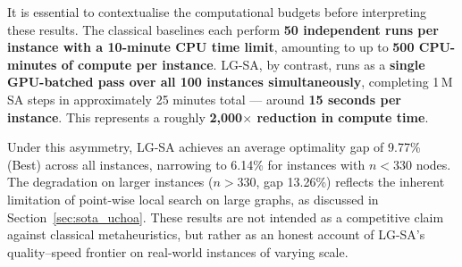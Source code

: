 \documentclass[letterpaper]{article} %
\begin{document}
It is essential to contextualise the computational budgets before interpreting these results.
The classical baselines each perform \textbf{50 independent runs per instance with a 10-minute CPU time limit}, amounting to up to \textbf{500 CPU-minutes of compute per instance}.
LG-SA, by contrast, runs as a \textbf{single GPU-batched pass over all 100 instances simultaneously}, completing 1\,M SA steps in approximately 25 minutes total — around \textbf{15 seconds per instance}.
This represents a roughly \textbf{2{,}000$\times$ reduction in compute time}.

Under this asymmetry, LG-SA achieves an average optimality gap of 9.77\% (Best) across all instances, narrowing to 6.14\% for instances with $n < 330$ nodes.
The degradation on larger instances ($n > 330$, gap 13.26\%) reflects the inherent limitation of point-wise local search on large graphs, as discussed in Section~\ref{sec:sota_uchoa}.
These results are not intended as a competitive claim against classical metaheuristics, but rather as an honest account of LG-SA's quality--speed frontier on real-world instances of varying scale.
\end{document}
